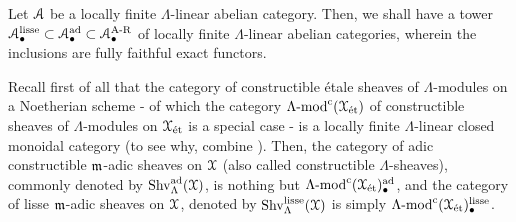                 \begin{proposition} \label{prop: adic_categories_are_linear_and_abelian}
                    Let $\mathcal{A}$ be a locally finite $\Lambda$-linear abelian category. Then, we shall have a tower $\mathcal{A}_{\bullet}^{\mathrm{lisse}} \subset \mathcal{A}_{\bullet}^{\mathrm{ad}} \subset \mathcal{A}_{\bullet}^{\mathrm{A\text{-}R}}$ of locally finite $\Lambda$-linear abelian categories, wherein the inclusions are fully faithful exact functors.
                \end{proposition}
                \begin{example} \label{example: adic_sheaves}
                    Recall first of all that the category of constructible \'etale sheaves of $\Lambda$-modules on a Noetherian scheme - of which the category $\Lambda\text{-}\mathrm{mod}^{\mathrm{c}}(\mathcal{X}_{\mathrm{\acute{e}t}})$ of constructible sheaves of $\Lambda$-modules on $\mathcal{X}_{\mathrm{\acute{e}t}}$ is a special case - is a locally finite $\Lambda$-linear closed monoidal category (to see why, combine \cite[Propositions 3.20 and 3.22]{behrend_l_adic_sheaves_for_algebraic_stacks}). Then, the category of adic constructible $\mathfrak{m}$-adic sheaves on $\mathcal{X}$ (also called constructible $\Lambda$-sheaves), commonly denoted by $\mathrm{Shv}_{\Lambda}^{\mathrm{ad}}(\mathcal{X})$, is nothing but $\Lambda\text{-}\mathrm{mod}^{\mathrm{c}}(\mathcal{X}_{\mathrm{\acute{e}t}})_{\bullet}^{\mathrm{ad}}$, and the category of lisse $\mathfrak{m}$-adic sheaves on $\mathcal{X}$, denoted by $\mathrm{Shv}_{\Lambda}^{\mathrm{lisse}}(\mathcal{X})$ is simply $\Lambda\text{-}\mathrm{mod}^{\mathrm{c}}(\mathcal{X}_{\mathrm{\acute{e}t}})_{\bullet}^{\mathrm{lisse}}$.
                \end{example}
                
